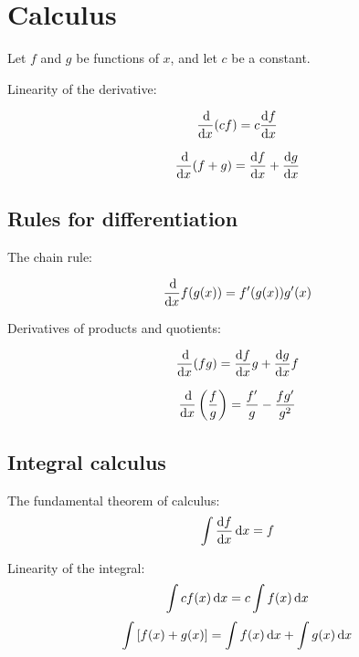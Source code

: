 \section{Calculus}

\noindent Let $f$ and $g$ be functions of $x$, and let $c$ be a constant.

\noindent Linearity of the derivative:

\begin{equation*} \frac{\operatorname{d\!}}{\operatorname{d\!} x}(cf)=c \frac{\operatorname{d\!} f}{\operatorname{d\!} x} \end{equation*}

\begin{equation*} \frac{\operatorname{d\!}}{\operatorname{d\!} x}(f+g)=\frac{\operatorname{d\!} f}{\operatorname{d\!} x} + \frac{\operatorname{d\!} g}{\operatorname{d\!} x} \end{equation*}

\subsection{Rules for differentiation}

\noindent The chain rule:

\begin{equation*} \frac{\operatorname{d\!}}{\operatorname{d\!} x}f(g(x)) = f'(g(x))g'(x) \end{equation*}

\noindent Derivatives of products and quotients:

\begin{equation*} \frac{\operatorname{d\!}}{\operatorname{d\!} x} (fg) = \frac{\operatorname{d\!} f}{\operatorname{d\!} x} g + \frac{\operatorname{d\!} g}{\operatorname{d\!} x} f\end{equation*}

\begin{equation*} \frac{\operatorname{d\!}}{\operatorname{d\!} x}\left(\frac{f}{g}\right) = \frac{f'}{g}-\frac{fg'}{g^2}\end{equation*}

\subsection{Integral calculus}

\noindent The fundamental theorem of calculus:
\begin{equation*} \int \frac{\operatorname{d\!} f}{\operatorname{d\!} x}\operatorname{d\!} x = f \end{equation*}

\noindent Linearity of the integral:
\begin{equation*} \int cf(x)\operatorname{d\!} x = c\int f(x)\operatorname{d\!} x\end{equation*}
\begin{equation*} \int\left[f(x)+g(x)\right] = \int f(x) \operatorname{d\!} x + \int g(x) \operatorname{d\!} x \end{equation*}

